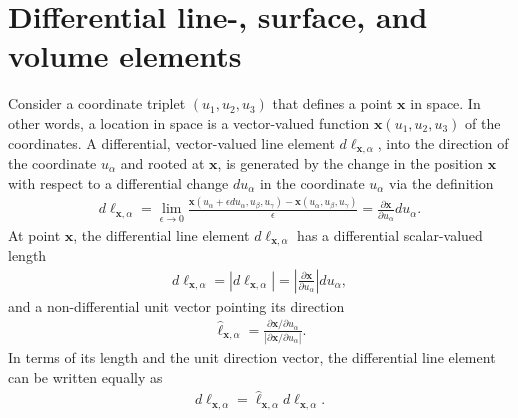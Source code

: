 \section{Differential line-, surface, and volume elements}
Consider a coordinate triplet $(u_1,u_2,u_3)$ that defines a point $\bm{x}$ in space. In other words, a location in space is a vector-valued function $\bm{x}(u_1,u_2,u_3)$ of the coordinates. A differential, vector-valued line element $d\bm{\ell}_{\bm{x},\alpha}$, into the direction of the coordinate $u_\alpha$ and rooted at $\bm{x}$, is generated by the change in the position $\bm{x}$ with respect to a differential change $du_\alpha$ in the coordinate $u_\alpha$ via the definition
\begin{align}
    d\bm{\ell}_{\bm{x},\alpha}=\lim_{\epsilon\to0}\frac{\bm{x}(u_\alpha+\epsilon du_\alpha,u_\beta,u_\gamma)-\bm{x}(u_\alpha,u_\beta,u_\gamma)}{\epsilon}=\frac{\partial\bm{x}}{\partial u_\alpha}du_\alpha.
\end{align}
At point $\bm{x}$, the differential line element $d\bm{\ell}_{\bm{x},\alpha}$ has a differential scalar-valued length 
\begin{align}
    d\ell_{\bm{x},\alpha}=\left|d\bm{\ell}_{\bm{x},\alpha}\right|=\left|\frac{\partial\bm{x}}{\partial u_\alpha}\right|du_\alpha,
\end{align}
and a non-differential unit vector pointing its direction
\begin{align}
    \bm{\hat{\ell}}_{\bm{x},\alpha}=\frac{\partial \bm{x}/\partial u_\alpha}{\left|\partial\bm{x}/\partial u_\alpha\right|}.
\end{align}
In terms of its length and the unit direction vector, the differential line element can be written equally as
\begin{align}
    d\bm{\ell}_{\bm{x},\alpha}=\bm{\hat{\ell}}_{\bm{x},\alpha}d\ell_{\bm{x},\alpha}.
\end{align}

